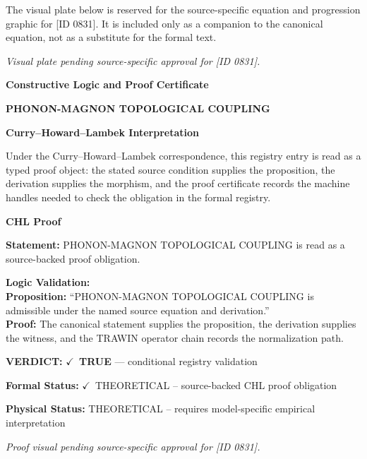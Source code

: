 \begingroup\footnotesize\sloppy
The visual plate below is reserved for the source-specific equation and progression graphic for [ID 0831]. It is included only as a companion to the canonical equation, not as a substitute for the formal text.
\par\endgroup
\begingroup\footnotesize\itshape
Visual plate pending source-specific approval for [ID 0831].
\par\endgroup

\clearpage
\begingroup\tzpsupportsetup
\noindent\textbf{\fontsize{10.8pt}{12.8pt}\selectfont [ID 0831] Constructive Logic and Proof Certificate}\par
\noindent\textbf{\fontsize{10pt}{12pt}\selectfont PHONON-MAGNON TOPOLOGICAL COUPLING}\par
\vspace{0.45em}
\begingroup
\footnotesize
\setlength{\parskip}{0.22em}
\setlength{\parindent}{0pt}
\noindent\textbf{Curry--Howard--Lambek Interpretation}\par
Under the Curry--Howard--Lambek correspondence, this registry entry is read as a typed proof
object: the stated source condition supplies the proposition, the derivation supplies the
morphism, and the proof certificate records the machine handles needed to check the obligation
in the formal registry.

\vspace{0.45em}
\noindent\textbf{CHL Proof}\par
\textbf{Statement:} PHONON-MAGNON TOPOLOGICAL COUPLING is read as a source-backed proof obligation.

\textbf{Logic Validation:}\\
\textbf{Proposition:} ``PHONON-MAGNON TOPOLOGICAL COUPLING is admissible under the named source equation and derivation.''\\
\textbf{Proof:} The canonical statement supplies the proposition, the derivation supplies the witness, and the TRAWIN operator chain records the normalization path.

\textbf{VERDICT:} \ensuremath{\checkmark}\ \textbf{TRUE} --- conditional registry validation

\textbf{Formal Status:} \ensuremath{\checkmark}\ THEORETICAL -- source-backed CHL proof obligation

\textbf{Physical Status:} THEORETICAL -- requires model-specific empirical interpretation
\par\vspace{0.45em}
\par
\vfill
\begingroup\footnotesize\itshape
Proof visual pending source-specific approval for [ID 0831].
\par\endgroup
\vfill
\endgroup
\endgroup
